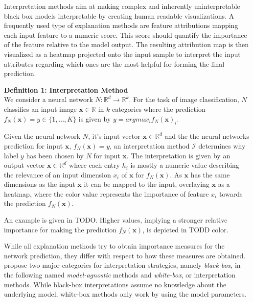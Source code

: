 Interpretation methods aim at making complex and inherently uninterpretable black box models interpretable by creating human readable visualizations. 
A frequently used type of explanation methods are feature attributions mapping each input feature to a numeric score. This score should quantify the importance of the feature relative to the model output. The resulting attribution map is then visualized as a heatmap projected onto the input sample to interpret the input attributes regarding which ones are the most helpful for forming the final prediction. 

\textbf{Definition 1: Interpretation Method}\\
We consider a neural network $N: \mathbb{R}^d \to \mathbb{R}^k$. For the task of image classification, $N$ classifies an input image $\mathbf{x}\in \mathbb{R}$ in $k$ categories where the prediction $f_N(\mathbf{x})=y \in \{1, ..., K\}$ is given by $y = arg max_i f_N(\mathbf{x})_i$.

Given the neural network $N$, it's input vector $\mathbf{x} \in \mathbb{R}^d$ and the the neural networks prediction for input $\mathbf{x}$, $f_N(\mathbf{x})=y$, an interpretation method $\mathcal{I}$ determines why label $y$ has been chosen by $N$ for input $\mathbf{x}$. 
The interpretation is given by an output vector $\mathbf{x} \in \mathbb{R}^d$ where each entry $h_i$ is mostly a numeric value describing the relevance of an input dimension $x_i$ of $\mathbf{x}$ for $f_N(\mathbf{x})$. 
As $\mathbf{x}$ has the same dimensions as the input $\mathbf{x}$ it can be mapped to the input, overlaying $\mathbf{x}$ as a heatmap, where the color value represents the importance of feature $x_i$ towards the prediction $f_N(\mathbf{x})$.

An example is given in TODO. Higher values, implying a stronger relative importance for making the prediction $f_N(\mathbf{x})$, is depicted in TODD color. 



While all explanation methods try to obtain importance measures for the network prediction, they differ with respect to how these measures are obtained. 
\cite{evaluating_explanations_security} propose two major categories for interpretation strategies, namely \textit{black-box}, in the following named \textit{model-agnostic} methods and \textit{white-box}, or \textit{} interpretation methods. 
While black-box interpretations assume no knowledge about the underlying model, white-box methods only work by using the model parameters. 

